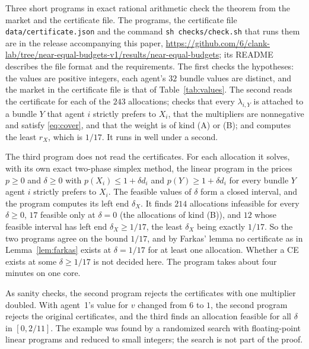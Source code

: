 \documentclass[11pt]{article}
\theoremstyle{definition}
\theoremstyle{remark}
\begin{document}
Three short programs in exact rational arithmetic check the theorem from
the market and the certificate file. The programs, the certificate file
\texttt{data/certificate.json} and the command \texttt{sh checks/check.sh}
that runs them are in the release accompanying this paper,
\url{https://github.com/6/clank-lab/tree/near-equal-budgets-v1/results/near-equal-budgets};
its README describes the file format and the requirements. The first checks the hypotheses: the values are positive
integers, each agent's $32$ bundle values are distinct, and the market in
the certificate file is that of Table~\ref{tab:values}. The second reads
the certificate for each of the $243$ allocations; checks that every
$\lambda_{i,Y}$ is attached to a bundle $Y$ that agent $i$ strictly prefers
to $X_i$, that the multipliers are nonnegative and satisfy
\eqref{eq:cover}, and that the weight is of kind (A) or (B); and computes
the least $r_X$, which is $1/17$. It runs in well under a second.

The third program does not read the certificates. For each allocation it
solves, with its own exact two-phase simplex method, the linear program in
the prices $p\ge0$ and $\delta\ge0$ with $p(X_i)\le 1+\delta d_i$ and
$p(Y)\ge1+\delta d_i$ for every bundle $Y$ agent $i$ strictly prefers to
$X_i$. The feasible values of $\delta$ form a closed interval, and the
program computes its left end $\delta_X$. It finds $214$ allocations
infeasible for every $\delta\ge0$, $17$ feasible only at $\delta=0$ (the
allocations of kind (B)), and $12$ whose feasible interval has left end
$\delta_X\ge1/17$, the least $\delta_X$ being exactly $1/17$. So the two
programs agree on the bound $1/17$, and by Farkas' lemma no certificate as
in Lemma~\ref{lem:farkas} exists at $\delta=1/17$ for at least one
allocation. Whether a CE exists at some
$\delta\ge1/17$ is not decided here. The program takes about four
minutes on one core.

As sanity checks, the second program rejects the certificates with one
multiplier doubled. With agent~1's value for $v$ changed from $6$ to $1$,
the second program rejects the original certificates, and the third finds
an allocation feasible for all $\delta$ in $[0,2/11]$. The example was found by a randomized search with
floating-point linear programs and reduced to small integers; the search
is not part of the proof.
\end{document}
